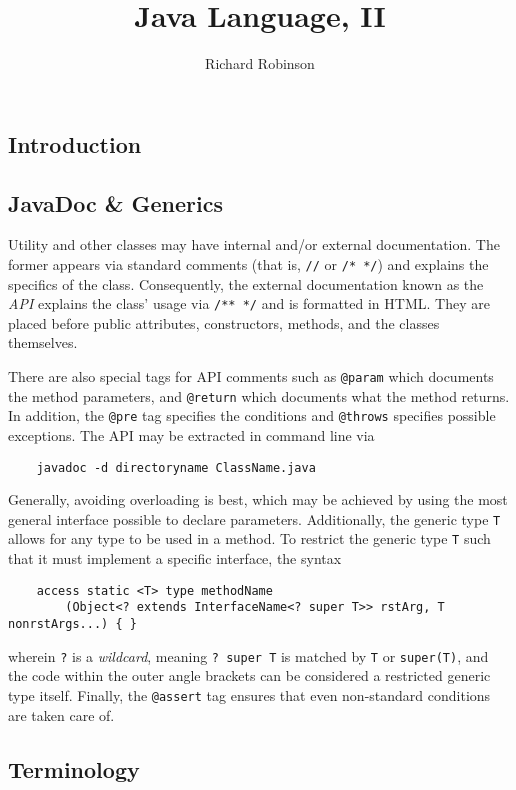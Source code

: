 \documentclass[letterpaper, openany, justified]{tufte-book}
\title{Java Language, II}
\author{Richard Robinson}
\newcommand{\cd}[1]{\lstinline{#1}}
\begin{document}
\maketitle
\tableofcontents
\setlength{\parindent}{0pt}
\begin{fullwidth}

\chapter{Introduction}

\section{JavaDoc \& Generics}

Utility and other classes may have internal and/or external documentation. The former appears via standard comments (that is, \cd{//} or \cd{/* */}) and explains the specifics of the class. Consequently, the external documentation known as the \emph{API} explains the class' usage via \cd{/** */} and is formatted in HTML. They are placed before public attributes, constructors, methods, and the classes themselves.

\bigskip
There are also special tags for API comments such as \cd{@param} which documents the method parameters, and \cd{@return} which documents what the method returns. In addition, the \cd{@pre} tag specifies the conditions and \cd{@throws} specifies possible exceptions. The API may be extracted in command line via
\begin{lstlisting}
    javadoc -d directoryname ClassName.java
\end{lstlisting}
Generally, avoiding overloading is best, which may be achieved by using the most general interface possible to declare parameters. Additionally, the generic type \cd{T} allows for any type to be used in a method. To restrict the generic type \cd{T} such that it must implement a specific interface, the syntax
\begin{lstlisting}
    access static <T> type methodName
        (Object<? extends InterfaceName<? super T>> rstArg, T nonrstArgs...) { }
\end{lstlisting}
wherein \cd{?} is a \emph{wildcard}, meaning \cd{? super T} is matched by \cd{T} or \cd{super(T)}, and the code within the outer angle brackets can be considered a restricted generic type itself. Finally, the \cd{@assert} tag ensures that even non-standard conditions are taken care of.

\section{Terminology}




\end{fullwidth}
\end{document}

